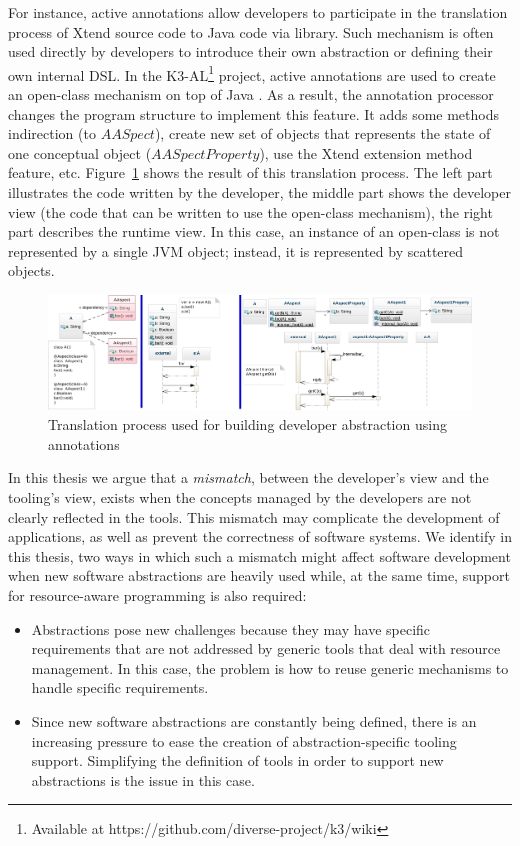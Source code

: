For instance, active annotations allow developers to participate in the translation process of Xtend source code to Java code via library.
Such mechanism is often used directly by developers to introduce their own abstraction or defining their own internal DSL.
In the K3-AL\footnote{Available at https://github.com/diverse-project/k3/wiki} project, active annotations are used to create an open-class mechanism on top of Java \cite{Clifton:2000:MMO:353171.353181}. 
As a result, the annotation processor changes the program structure to implement this feature. 
It adds some methods indirection (to $AASpect$), create new set of objects that represents the state of one conceptual object ($AASpectProperty$), use the Xtend extension method feature, etc.
Figure~\ref{fig:k3-diagram} shows the result of this translation process. 
The left part illustrates the code written by the developer, the middle part shows the developer view (the code that can be written to use the open-class mechanism), the right part describes the runtime view.
In this case, an instance of an open-class is not represented by a single JVM object; instead, it is represented by scattered objects.  

\begin{figure}
\centering
\includegraphics[width=0.9\linewidth]{chapter2/fig/famous}
\caption{Translation process used for building developer abstraction using annotations}
\label{fig:k3-diagram}
\end{figure}

In this thesis we argue that a \textit{mismatch}, between the developer's view and the tooling's view, exists when the concepts managed by the developers are not clearly reflected in the tools.
This mismatch may complicate the development of applications, as well as prevent the correctness of software systems.
We identify in this thesis, two ways in which such a mismatch might affect software development when new software abstractions are heavily used while, at the same time, support for resource-aware programming is also required:

\begin{itemize}
\item Abstractions pose new challenges because they may have specific requirements that are not addressed by generic tools that deal with resource management.
In this case, the problem is how to reuse generic mechanisms to handle specific requirements.

\item Since new software abstractions are constantly being defined, there is an increasing pressure to ease the creation of abstraction-specific tooling support.
Simplifying the definition of tools in order to support new abstractions is the issue in this case. 
\end{itemize}

